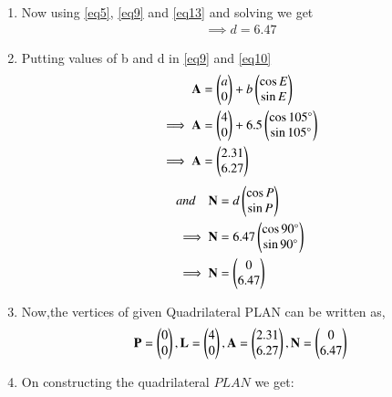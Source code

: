 \documentclass[journal,12pt,twocolumn]{IEEEtran}
\begin{document}
\begin{enumerate}
\begin{proof}
\begin{align}
\frac{(A-N)^\intercal(A-L)}{(A-N)^\intercal(P-N)}\times\frac{d}{b}=\frac{\cos A}{\cos N}
\\
\frac{A^\intercal A-A^\intercal L-N^\intercal A+N^\intercal L}{-A^\intercal N+N^\intercal N}= \frac{b}{d}\times\frac{\cos A}{\cos N}  \quad(\because \vec{P}=0) 
\end{align}
\begin{align}
Let \quad S=b\times\frac{\cos A}{\cos N} \label{eq13}
\end{align}
\begin{align}
\implies d=\frac{S(-A^\intercal N+N^\intercal N)}{A^\intercal A-A^\intercal L-N^\intercal A+N^\intercal L}
\end{align}
\end{proof}
\item Now using \eqref{eq5}, \eqref{eq9} and \eqref{eq13} and solving we get
\begin{align}
\implies d=6.47
\end{align}
\item Putting values of b and d in \eqref{eq9} and \eqref{eq10}
\begin{align}
\mathbf{A}&=\begin{pmatrix}a\\0\end{pmatrix} +b \begin{pmatrix}\cos E\\\sin E\end{pmatrix} 
\\
\implies\mathbf{A}&=\begin{pmatrix}4\\0\end{pmatrix} +6.5 \begin{pmatrix}\cos 105\degree\\\sin 105\degree\end{pmatrix} 
\\
\implies\mathbf{A}&=\begin{pmatrix}2.31\\6.27\end{pmatrix}
\end{align}
\begin{align}
and \quad \mathbf{N}&=d \begin{pmatrix}\cos P\\\sin P\end{pmatrix}
\\
\implies\mathbf{N}&=6.47 \begin{pmatrix}\cos 90\degree\\\sin 90\degree\end{pmatrix}
\\
\implies\mathbf{N}&=\begin{pmatrix}0\\6.47\end{pmatrix}
\end{align}
\item Now,the vertices of given Quadrilateral PLAN can be written as,
\begin{align}
\mathbf{P}=\begin{pmatrix}0\\0\end{pmatrix},\mathbf{L} = \begin{pmatrix}4\\0\end{pmatrix}, \mathbf{A}=\begin{pmatrix}2.31\\6.27\end{pmatrix},\mathbf{N}=\begin{pmatrix}0\\6.47\end{pmatrix}
\end{align}
\item On constructing the quadrilateral $PLAN$ we get:
\end{enumerate}
\end{document}
